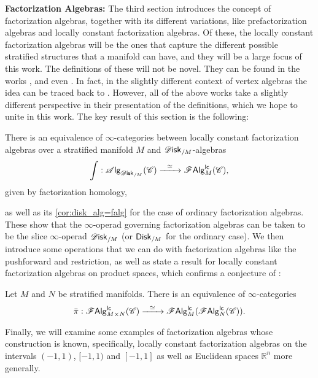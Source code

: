 \documentclass[../text]{subfiles}
\begin{document}
\textbf{ Factorization Algebras:} The third section introduces the concept of factorization algebras, together with its different variations, like prefactorization algebras and locally constant factorization algebras. Of these, the locally constant factorization algebras will be the ones that capture the different possible stratified structures that a manifold can have, and they will be a large focus of this work. The definitions of these will not be novel. They can be found in the works \cite{cg2016}, \cite{ginot2015} and even \cite{af_primer}. In fact, in the slightly different context of vertex algebras the idea can be traced back to \cite{bd2004}. However, all of the above works take a slightly different perspective in their presentation of the definitions, which we hope to unite in this work. The key result of this section is the following:
%
\begin{theorem*}[\ref{thm:disk_alg=lcfa}]
    There is an equivalence of $\infty$-categories between locally constant factorization algebras over a stratified manifold $M$ and $\disk_{/M}$-algebras
    \begin{equation}
        \int: \alg{\disk_{/M}} (\catC) \xrightarrow{\ \ \simeq \ \ } \lcfa_M (\catC),
    \end{equation}
    given by factorization homology,
\end{theorem*}
%
as well as its \cref{cor:disk_alg=falg} for the case of ordinary factorization algebras. These show that the $\infty$-operad governing factorization algebras can be taken to be the slice $\infty$-operad $\disk_{/M}$ (or $\disk[r]_{/M}$ for the ordinary case). We then introduce some operations that we can do with factorization algebras like the pushforward and restriction, as well as state a result for locally constant factorization algebras on product spaces, which confirms a conjecture of \cite{ginot2015}:
%
\begin{proposition*}[\ref{prop:exp_of_products_lc}]
    Let $M$ and $N$ be stratified manifolds. There is an equivalence of $\infty$-categories
    \begin{equation}
        \bar{\pi}: \mathscr{F} \mathsf{Alg}^{\mathsf{lc}}_{M \times N}(\mathscr{C}) \xrightarrow{\ \ \simeq \ \ } \mathscr{F} \mathsf{Alg}^{\mathsf{lc}}_{M}(\mathscr{F} \mathsf{Alg}^{\mathsf{lc}}_{N}(\mathscr{C})).
    \end{equation}
\end{proposition*}
%
Finally, we will examine some examples of factorization algebras whose construction is known, specifically, locally constant factorization algebras on the intervals $(-1,1)$, $[-1,1)$ and $[-1,1]$ as well as Euclidean spaces $\mathbb{R}^n$ more generally.
\end{document}
